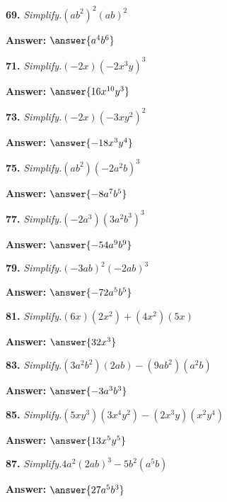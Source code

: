 \documentclass{ximera}
\begin{document}
\begin{problem}
\textbf{69.} \emph{Simplify.}\quad $(ab^2)^2(ab)^2$

\textbf{Answer:} $\answer{a^4b^6}$
\end{problem}

\begin{problem}
\textbf{71.} \emph{Simplify.}\quad $(-2x)(-2x^3y)^3$

\textbf{Answer:} $\answer{16x^{10}y^3}$
\end{problem}

\begin{problem}
\textbf{73.} \emph{Simplify.}\quad $(-2x)(-3xy^2)^2$

\textbf{Answer:} $\answer{-18x^3y^4}$
\end{problem}

\begin{problem}
\textbf{75.} \emph{Simplify.}\quad $(ab^2)(-2a^2b)^3$

\textbf{Answer:} $\answer{-8a^7b^5}$
\end{problem}

\begin{problem}
\textbf{77.} \emph{Simplify.}\quad $(-2a^3)(3a^2b^3)^3$

\textbf{Answer:} $\answer{-54a^9b^9}$
\end{problem}

\begin{problem}
\textbf{79.} \emph{Simplify.}\quad $(-3ab)^2(-2ab)^3$

\textbf{Answer:} $\answer{-72a^5b^5}$
\end{problem}

\begin{problem}
\textbf{81.} \emph{Simplify.}\quad $(6x)(2x^2) + (4x^2)(5x)$

\textbf{Answer:} $\answer{32x^3}$
\end{problem}

\begin{problem}
\textbf{83.} \emph{Simplify.}\quad $(3a^2b^2)(2ab) - (9ab^2)(a^2b)$

\textbf{Answer:} $\answer{-3a^3b^3}$
\end{problem}

\begin{problem}
\textbf{85.} \emph{Simplify.}\quad $(5xy^3)(3x^4y^2) - (2x^3y)(x^2y^4)$

\textbf{Answer:} $\answer{13x^5y^5}$
\end{problem}

\begin{problem}
\textbf{87.} \emph{Simplify.}\quad $4a^2(2ab)^3 - 5b^2(a^5b)$

\textbf{Answer:} $\answer{27a^5b^3}$
\end{problem}
\end{document}
